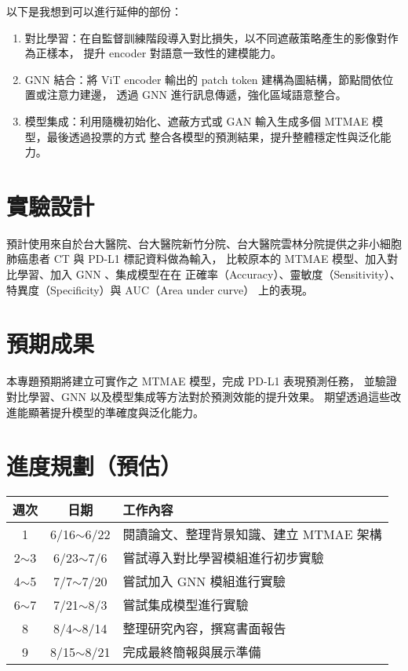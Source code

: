 \documentclass[12pt,a4paper]{article}
\begin{document}
以下是我想到可以進行延伸的部份：

\begin{enumerate}
    \item 對比學習：在自監督訓練階段導入對比損失，以不同遮蔽策略產生的影像對作為正樣本，
    提升 encoder 對語意一致性的建模能力。
    \item GNN 結合：將 ViT encoder 輸出的 patch token 建構為圖結構，節點間依位置或注意力建邊，
    透過 GNN 進行訊息傳遞，強化區域語意整合。
    \item 模型集成：利用隨機初始化、遮蔽方式或 GAN 輸入生成多個 MTMAE 模型，最後透過投票的方式
    整合各模型的預測結果，提升整體穩定性與泛化能力。
\end{enumerate}

\section{實驗設計}

預計使用來自於台大醫院、台大醫院新竹分院、台大醫院雲林分院提供之非小細胞肺癌患者 CT 與 PD-L1 標記資料做為輸入，
比較原本的 MTMAE 模型、加入對比學習、加入 GNN 、集成模型在在
正確率（Accuracy）、靈敏度（Sensitivity）、  特異度（Specificity）與 AUC（Area under curve）
上的表現。

\section{預期成果}
本專題預期將建立可實作之 MTMAE 模型，完成 PD-L1 表現預測任務，
並驗證對比學習、GNN 以及模型集成等方法對於預測效能的提升效果。
期望透過這些改進能顯著提升模型的準確度與泛化能力。

\section{進度規劃（預估）}
\begin{tabular}{|c|c |l|  }
    \hline
    週次 & 日期 & 工作內容 \\
    \hline\hline
    1 & 6/16$\sim$6/22 & 閱讀論文、整理背景知識、建立 MTMAE 架構 \\
    \hline
    2$\sim$3 & 6/23$\sim$7/6 & 嘗試導入對比學習模組進行初步實驗 \\
    \hline
    4$\sim$5 & 7/7$\sim$7/20 & 嘗試加入 GNN 模組進行實驗 \\
    \hline
    6$\sim$7 & 7/21$\sim$8/3 & 嘗試集成模型進行實驗 \\
    \hline
    8 & 8/4$\sim$8/14 & 整理研究內容，撰寫書面報告 \\
    \hline
    9 & 8/15$\sim$8/21 & 完成最終簡報與展示準備 \\
    \hline
\end{tabular}
\end{document}
